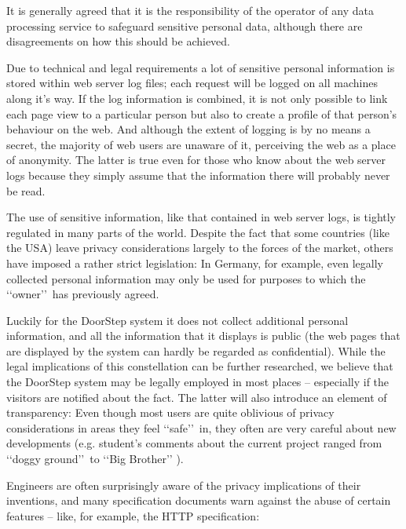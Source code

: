 \documentclass[a4paper,twoside]{danarticle}
\theoremstyle{remark}
\begin{document}
    It is generally agreed that it is the 
    responsibility of the operator of any data processing service to safeguard 
    sensitive personal data, although there are disagreements on how this should
    be achieved.
    
    Due to technical and legal requirements a lot of sensitive personal 
    information is stored within web server log files; each request will be 
    logged on all machines along it's way. If the log information is 
    combined, it is not only possible to link each page view to a particular 
    person but also to create a profile of that person's behaviour on the web. 
    And although the extent of logging is by no means a secret, the majority 
    of web users are unaware of it, perceiving the web as a place of anonymity.
    The latter is true even for those who know about the web server logs because
    they simply assume that the information there will probably never be read.
    
    The use of sensitive information, like that contained in web server logs,
    is tightly regulated in many parts of the world. Despite the fact 
    that some countries (like the USA) leave privacy considerations largely to 
    the forces of the market, others have imposed a rather strict legislation: 
    In Germany, for example, even legally collected personal information may 
    only be used for purposes to which the \lq\lq owner\rq\rq\ has previously
    agreed. 
    
    Luckily for the DoorStep system it does not collect additional personal
    information, and all the information that it displays is public 
    (the web pages that are displayed by the system can hardly be 
    regarded as confidential). While the legal implications of this
    constellation can be further researched, we believe that the DoorStep system
    may be legally employed in most places -- especially if the visitors are
    notified about the fact. The latter will also introduce an element of
    transparency:  Even though most users are quite oblivious of privacy 
    considerations in areas they feel \lq\lq safe\rq\rq\ in, they often are very 
    careful about new developments (e.g. student's comments about the current 
    project ranged from \lq\lq doggy ground\rq\rq\ to \lq\lq Big Brother\rq\rq 
    ).
    
    Engineers are often surprisingly aware of the privacy implications of their 
    inventions, and many specification documents warn against the abuse of 
    certain features -- like, for example, the HTTP specification\cite{http}:
    
\end{document}
